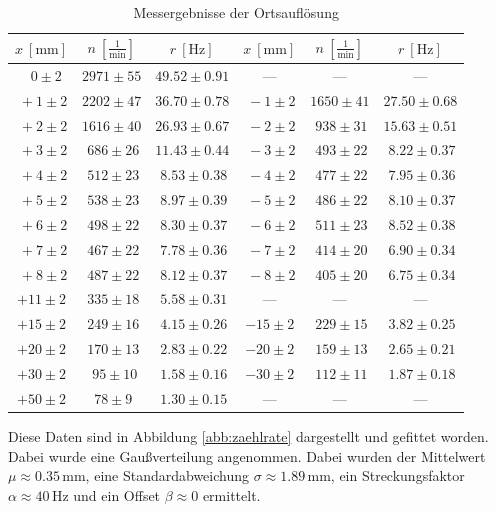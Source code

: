 \documentclass[12pt,a4paper]{scrartcl}
\numberwithin{equation}{section} %
\begin{document}
\begin{table}[h]
	\centering
	\begin{tabular}{c|c|c||c|c|c}
		$x\ [\mathrm{mm}]$ & $n\ [\frac{1}{\mathrm{min}}]$ & $r\ [\mathrm{Hz}]$ &
		$x\ [\mathrm{mm}]$ & $n\ [\frac{1}{\mathrm{min}}]$ & $r\ [\mathrm{Hz}]$ \vspace{1pt}\\
		\hline
		$\ \ \ 0 \pm 2$ & $2971 \pm 55$ & $49.52 \pm 0.91$ &---&---&--- \\
		$\ +1 \pm 2$ & $2202 \pm 47$ & $36.70 \pm 0.78$ &
		$\ -1 \pm 2$ & $1650 \pm 41$ & $27.50 \pm 0.68$ \\
		$\ +2 \pm 2$ & $1616 \pm 40$ & $26.93 \pm 0.67$ &
		$\ -2 \pm 2$ & $\ 938 \pm 31$ & $15.63 \pm 0.51$ \\
		$\ +3 \pm 2$ & $\ 686 \pm 26$ & $11.43 \pm 0.44$ &
		$\ -3 \pm 2$ & $\ 493 \pm 22$ & $\ 8.22 \pm 0.37$ \\
		$\ +4 \pm 2$ & $\ 512 \pm 23$ & $\ 8.53 \pm 0.38$ &
		$\ -4 \pm 2$ & $\ 477 \pm 22$ & $\ 7.95 \pm 0.36$ \\
		$\ +5 \pm 2$ & $\ 538 \pm 23$ & $\ 8.97 \pm 0.39$ &
		$\ -5 \pm 2$ & $\ 486 \pm 22$ & $\ 8.10 \pm 0.37$ \\
		$\ +6 \pm 2$ & $\ 498 \pm 22$ & $\ 8.30 \pm 0.37$ &
		$\ -6 \pm 2$ & $\ 511 \pm 23$ & $\ 8.52 \pm 0.38$ \\
		$\ +7 \pm 2$ & $\ 467 \pm 22$ & $\ 7.78 \pm 0.36$ &
		$\ -7 \pm 2$ & $\ 414 \pm 20$ & $\ 6.90 \pm 0.34$ \\
		$\ +8 \pm 2$ & $\ 487 \pm 22$ & $\ 8.12 \pm 0.37$ &
		$\ -8 \pm 2$ & $\ 405 \pm 20$ & $\ 6.75 \pm 0.34$ \\
		$+11 \pm 2$ & $\ 335 \pm 18$ & $\ 5.58 \pm 0.31$ &---&---&---\\
		$+15 \pm 2$ & $\ 249 \pm 16$ & $\ 4.15 \pm 0.26$ &
		$-15 \pm 2$ & $\ 229 \pm 15$ & $\ 3.82 \pm 0.25$ \\
		$+20 \pm 2$ & $\ 170 \pm 13$ & $\ 2.83 \pm 0.22$ &
		$-20 \pm 2$ & $\ 159 \pm 13$ & $\ 2.65 \pm 0.21$ \\
		$+30 \pm 2$ & $\ \ 95 \pm 10$ & $\ 1.58 \pm 0.16$ &
		$-30 \pm 2$ & $\ 112 \pm 11$ & $\ 1.87 \pm 0.18$ \\
		$+50 \pm 2$ & $\ 78 \pm 9$ & $\ 1.30 \pm 0.15$ &---&---&---
	\end{tabular}
	\caption{Messergebnisse der Ortsauflösung}
	\label{tab:Ortsauflösung}
\end{table}

\noindent
Diese Daten sind in Abbildung \ref{abb:zaehlrate} dargestellt und gefittet worden. Dabei wurde eine Gaußverteilung angenommen. Dabei wurden der Mittelwert $\mu\approx 0.35\,\mathrm{mm}$, eine Standardabweichung $\sigma\approx1.89\,\mathrm{mm}$, ein Streckungsfaktor $\alpha\approx 40\,\mathrm{Hz}$ und ein Offset $\beta\approx 0$ ermittelt.
\end{document}
